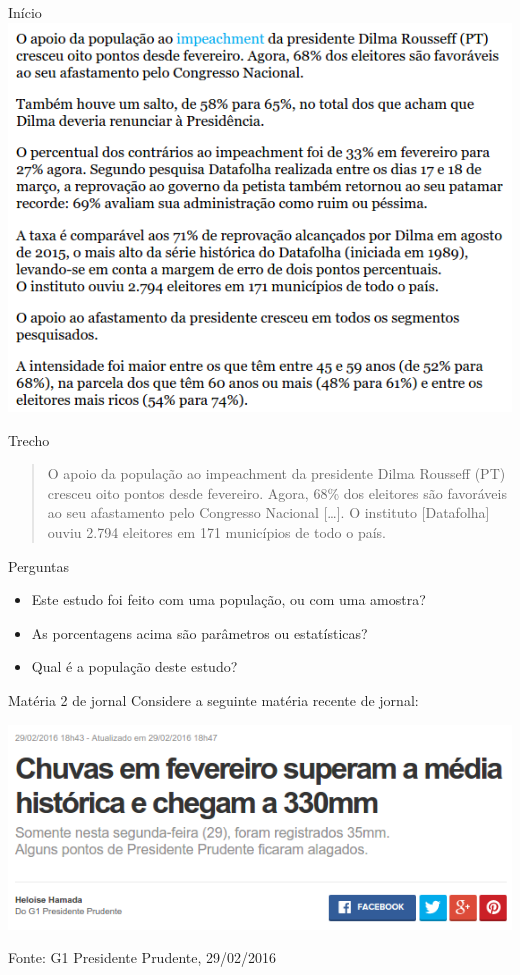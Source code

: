 \documentclass{beamer}
\begin{document}
\begin{frame}{Início}
  \centering \includegraphics[height=.9\textheight]{Revisao1/texto}
\end{frame}

\begin{frame}{Trecho}
  \begin{quote}
    O apoio da população ao impeachment da presidente Dilma Rousseff
    (PT) cresceu oito pontos desde fevereiro. Agora, 68\% dos
    eleitores são favoráveis ao seu afastamento pelo Congresso
    Nacional [\ldots]. O instituto [Datafolha] ouviu 2.794 eleitores em 171
    municípios de todo o país.
  \end{quote}
  \begin{block}{Perguntas}
    \begin{itemize}
    \item Este estudo foi feito com uma população, ou com uma amostra?
    \item As porcentagens acima são parâmetros ou estatísticas?
    \item Qual é a população deste estudo?
    \end{itemize}
  \end{block}
\end{frame}

\begin{frame}{Matéria 2 de jornal}
Considere a seguinte matéria recente de jornal:

\bigskip
\bigskip
\bigskip
\centering \includegraphics[width=.9\textwidth]{Revisao1/manchete2}

\vfill
Fonte: G1 Presidente Prudente, 29/02/2016
\end{frame}
\end{document}
